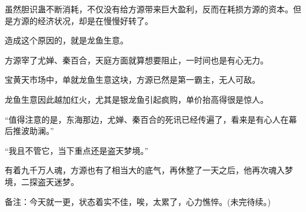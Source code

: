 \begin{this_body}
虽然胆识蛊不断消耗，不仅没有给方源带来巨大盈利，反而在耗损方源的资本。但是方源的经济状况，却是在慢慢好转了。

造成这个原因的，就是龙鱼生意。

方源宰了尤婵、秦百合，天庭方面就算想要阻止，一时间也是有心无力。

宝黄天市场中，单就龙鱼生意这块，方源已然是第一霸主，无人可敌。

龙鱼生意因此越加红火，尤其是银龙鱼引起疯购，单价抬高得很是惊人。

“值得注意的是，东海那边，尤婵、秦百合的死讯已经传遍了，看来是有心人在幕后推波助澜。”

“我且不管它，当下重点还是盗天梦境。”

有着九千万人魂，方源也有了相当大的底气，再休整了一天之后，他再次魂入梦境，二探盗天迷梦。

备注：今天就一更，状态着实不佳，唉，太累了，心力憔悴。(未完待续。)

\end{this_body}

